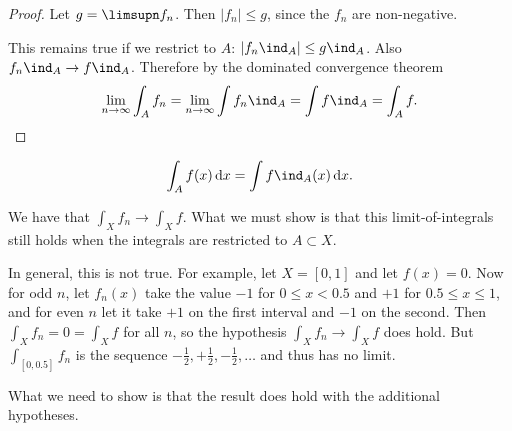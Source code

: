 \begin{proof}
  Let $g = \limsupn f_n$. Then $|f_n| \leq g$, since the $f_n$ are non-negative.

  This remains true if we restrict to $A$: $|f_n\ind_A| \leq g \ind_A$. Also $f_n\ind_A \to f\ind_A$. Therefore
  by the dominated convergence theorem
  \begin{align*}
    \limn \int_A f_n = \limn \int f_n\ind_A = \int f\ind_A = \int_A f.
  \end{align*}
\end{proof}


\begin{align*}
  \int_A f(x) \dx = \int f\ind_A(x) \dx.
\end{align*}
\begin{remark*}
  We have that $\int_X f_n \to \int_X f$. What we must show is that this limit-of-integrals still holds when
  the integrals are restricted to $A \subset X$.

  In general, this is not true. For example, let $X = [0, 1]$ and let $f(x) = 0$. Now for odd $n$, let $f_n(x)$
  take the value $-1$ for $0 \leq x < 0.5$ and $+1$ for $0.5 \leq x \leq 1$, and for even $n$ let it take $+1$
  on the first interval and $-1$ on the second. Then $\int_X f_n = 0 = \int_X f$ for all $n$, so the
  hypothesis $\int_X f_n \to \int_X f$ does hold. But $\int_{[0, 0.5]} f_n$ is the
  sequence $-\frac{1}{2}, +\frac{1}{2}, -\frac{1}{2}, \ldots$ and thus has no limit.

  What we need to show is that the result does hold with the additional hypotheses.
\end{remark*}

